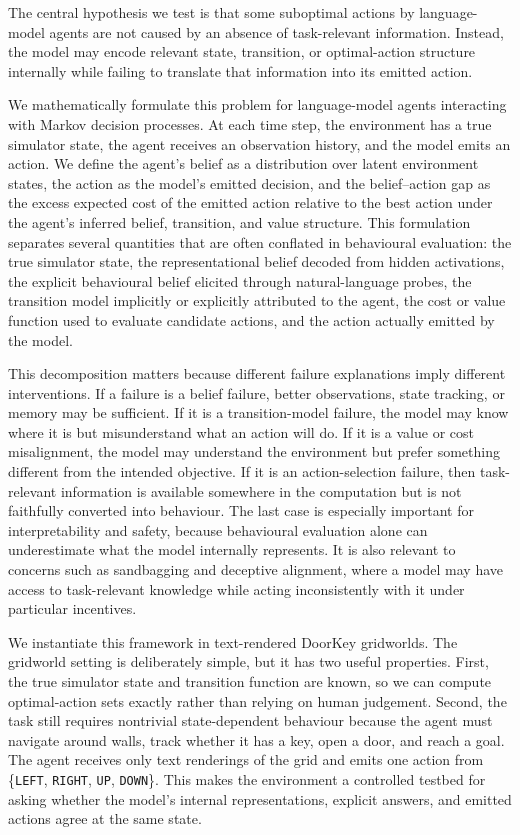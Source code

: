 \documentclass[final]{sparreport}
\begin{document}
\begin{claimbox}
The central hypothesis we test is that some suboptimal actions by language-model agents are not caused by an absence of task-relevant information. Instead, the model may encode relevant state, transition, or optimal-action structure internally while failing to translate that information into its emitted action.
\end{claimbox}

We mathematically formulate this problem for language-model agents interacting with Markov decision processes. At each time step, the environment has a true simulator state, the agent receives an observation history, and the model emits an action. We define the agent's belief as a distribution over latent environment states, the action as the model's emitted decision, and the belief--action gap as the excess expected cost of the emitted action relative to the best action under the agent's inferred belief, transition, and value structure. This formulation separates several quantities that are often conflated in behavioural evaluation: the true simulator state, the representational belief decoded from hidden activations, the explicit behavioural belief elicited through natural-language probes, the transition model implicitly or explicitly attributed to the agent, the cost or value function used to evaluate candidate actions, and the action actually emitted by the model.

This decomposition matters because different failure explanations imply different interventions. If a failure is a belief failure, better observations, state tracking, or memory may be sufficient. If it is a transition-model failure, the model may know where it is but misunderstand what an action will do. If it is a value or cost misalignment, the model may understand the environment but prefer something different from the intended objective. If it is an action-selection failure, then task-relevant information is available somewhere in the computation but is not faithfully converted into behaviour. The last case is especially important for interpretability and safety, because behavioural evaluation alone can underestimate what the model internally represents. It is also relevant to concerns such as sandbagging and deceptive alignment, where a model may have access to task-relevant knowledge while acting inconsistently with it under particular incentives.

We instantiate this framework in text-rendered DoorKey gridworlds. The gridworld setting is deliberately simple, but it has two useful properties. First, the true simulator state and transition function are known, so we can compute optimal-action sets exactly rather than relying on human judgement. Second, the task still requires nontrivial state-dependent behaviour because the agent must navigate around walls, track whether it has a key, open a door, and reach a goal. The agent receives only text renderings of the grid and emits one action from \{\texttt{LEFT}, \texttt{RIGHT}, \texttt{UP}, \texttt{DOWN}\}. This makes the environment a controlled testbed for asking whether the model's internal representations, explicit answers, and emitted actions agree at the same state.
\end{document}
